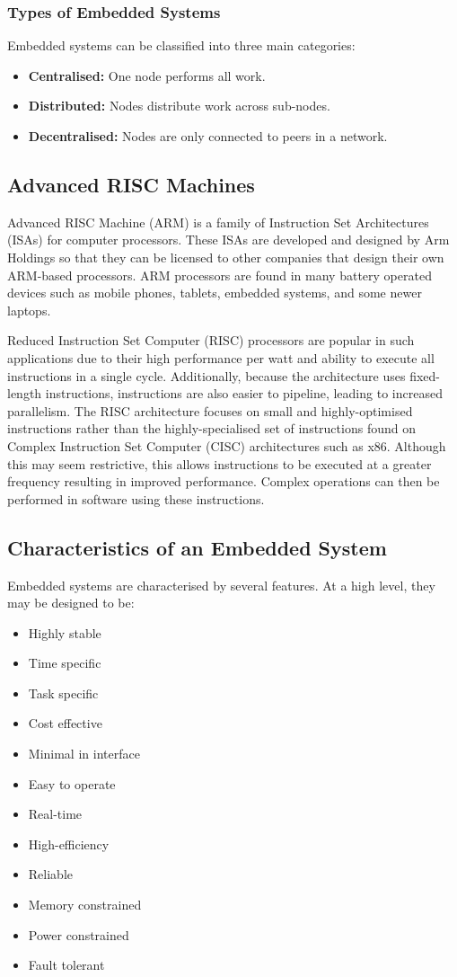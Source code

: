 \documentclass{article}
\begin{document}
\subsubsection{Types of Embedded Systems}
Embedded systems can be classified into three main categories:
\begin{itemize}
    \item \textbf{Centralised:} One node performs all work.
    \item \textbf{Distributed:} Nodes distribute work across sub-nodes.
    \item \textbf{Decentralised:} Nodes are only connected to peers in a network.
\end{itemize}
\subsection{Advanced RISC Machines}
Advanced RISC Machine (ARM) is a family of Instruction Set
Architectures (ISAs) for computer processors. These ISAs are developed
and designed by Arm Holdings so that they can be licensed to other
companies that design their own ARM-based processors. ARM processors
are found in many battery operated devices such as mobile phones,
tablets, embedded systems, and some newer laptops.

Reduced Instruction Set Computer (RISC) processors are popular in such
applications due to their high performance per watt and ability to
execute all instructions in a single cycle. Additionally, because the
architecture uses fixed-length instructions, instructions are also
easier to pipeline, leading to increased parallelism. The RISC
architecture focuses on small and highly-optimised instructions rather
than the highly-specialised set of instructions found on Complex
Instruction Set Computer (CISC) architectures such as x86. Although
this may seem restrictive, this allows instructions to be executed at a
greater frequency resulting in improved performance. Complex operations
can then be performed in software using these instructions.
\subsection{Characteristics of an Embedded System}
Embedded systems are characterised by several features. At a high
level, they may be designed to be:
\begin{itemize}
    \item Highly stable
    \item Time specific
    \item Task specific
    \item Cost effective
    \item Minimal in interface
    \item Easy to operate
    \item Real-time
    \item High-efficiency
    \item Reliable
    \item Memory constrained
    \item Power constrained
    \item Fault tolerant
\end{itemize}
\end{document}
